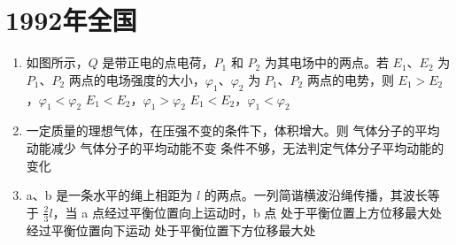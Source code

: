 \documentclass[\gkver]{gaokaozhenti}
\begin{document}
\chapter{1992年全国}

\begin{enumerate}
\item
如图所示，$Q$ 是带正电的点电荷，$P_{1}$ 和 $P_{2}$ 为其电场中的两点。若 $E_{1}$、$E_{2}$ 为 $P_{1}$、$P_{2}$ 两点的电场强度的大小，$\varphi_{1}$、$\varphi_{2}$ 为 $P_{1}$、$P_{2}$ 两点的电势，则
{$E_{1} > E_{2}$，$\varphi_{1} < \varphi_{2}$}
{$E_{1} < E_{2}$，$\varphi_{1} > \varphi_{2}$}
{$E_{1} < E_{2}$，$\varphi_{1} < \varphi_{2}$}


\item
一定质量的理想气体，在压强不变的条件下，体积增大。则
{气体分子的平均动能减少}
{气体分子的平均动能不变}
{条件不够，无法判定气体分子平均动能的变化}


\item
a、b 是一条水平的绳上相距为 $l$ 的两点。一列简谐横波沿绳传播，其波长等于 $\frac{2}{3}l$，当 a 点经过平衡位置向上运动时，b 点
{处于平衡位置上方位移最大处}
{经过平衡位置向下运动}
{处于平衡位置下方位移最大处}

\end{enumerate}
\end{document}
